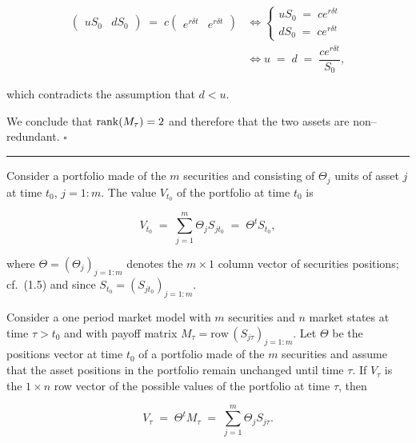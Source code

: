 \[
\begin{aligned}
\begin{pmatrix} uS_0 & dS_0 \end{pmatrix} \;=\; c\begin{pmatrix}
e^{r\delta t} & e^{r\delta t} \end{pmatrix}
&\iff
\begin{cases} uS_0 \;=\; ce^{r\delta t} \\ dS_0 \;=\; ce^{r\delta t}
\end{cases} \\[6pt]
&\iff u \;=\; d \;=\; \dfrac{ce^{r\delta t}}{S_0},
\end{aligned}
\]

which contradicts the assumption that $d < u$.

We conclude that $\operatorname{rank}(M_\tau) = 2$ and therefore that the two assets are
non--redundant. \hfill$\square$

\medskip
\noindent\rule{\linewidth}{0.4pt}
\medskip

Consider a portfolio made of the $m$ securities and consisting of
$\Theta_j$ units of asset $j$ at time $t_0$, $j = 1:m$. The value $V_{t_0}$
of the portfolio at time $t_0$ is

\begin{equation}
V_{t_0} \;=\; \sum_{j=1}^m \Theta_j S_{jt_0} \;=\; \Theta^t S_{t_0},
\end{equation}

where $\Theta = (\Theta_j)_{j=1:m}$ denotes the $m \times 1$ column vector
of securities positions; cf.\ (1.5) and since $S_{t_0} =
(S_{jt_0})_{j=1:m}$.

\begin{lemma}
Consider a one period market model with $m$ securities and $n$ market
states at time $\tau > t_0$ and with payoff matrix $M_\tau =
\mathrm{row}\,(S_{j\tau})_{j=1:m}$. Let $\Theta$ be the positions vector at
time $t_0$ of a portfolio made of the $m$ securities and assume that the
asset positions in the portfolio remain unchanged until time $\tau$. If
$V_\tau$ is the $1 \times n$ row vector of the possible values of the
portfolio at time $\tau$, then

\begin{equation}
V_\tau \;=\; \Theta^t M_\tau \;=\; \sum_{j=1}^m \Theta_j S_{j\tau}.
\end{equation}
\end{lemma}


